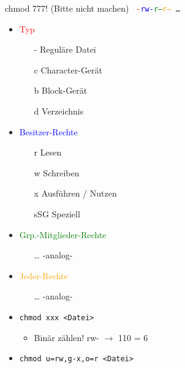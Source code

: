 \begin{frame}{chmod 777! \tiny(Bitte nicht machen)}
\texttt{\huge
\textcolor{red}{-}\textcolor{blue}{rw-}\textcolor{green}{r--}\textcolor{orange}{r--} …
}

\begin{minipage}{0.48\linewidth}
\vspace{0.5cm}
\begin{itemize}
\item \textcolor{red}{Typ}
\begin{itemize}
\item[-] Reguläre Datei
\item[c] Character-Gerät
\item[b] Block-Gerät
\item[d] Verzeichnis
\end{itemize}
\item \textcolor{blue}{Besitzer-Rechte}
\begin{itemize}
\item[r] Lesen
\item[w] Schreiben
\item[x] Ausführen / Nutzen
\item[sSG] Speziell
\end{itemize}
\end{itemize}
\end{minipage}%
\begin{minipage}{0.48\linewidth}
\vspace{0.5cm}
\begin{itemize}
\item \textcolor{green}{Grp.-Mitglieder-Rechte}
	\begin{itemize}
	\item[…] -analog-
	\end{itemize}
\item \textcolor{orange}{Jeder-Rechte}
	\begin{itemize}
	\item[…] -analog-
	\end{itemize}
\item \texttt{chmod xxx <Datei>}
	\begin{itemize}
	\item Binär zählen! rw- $\rightarrow$ 110 = 6
	\end{itemize}
\item \texttt{chmod u=rw,g-x,o=r <Datei>}
\end{itemize}
\end{minipage}

\end{frame}